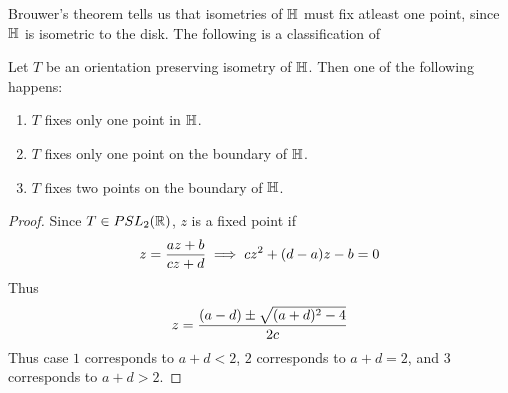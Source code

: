 Brouwer's theorem tells us that isometries of $\mathbb{H}$ must fix atleast one point, since $\mathbb{H}$ is isometric to the disk. The following is a classification of
\begin{theorem}
  Let $T$ be an orientation preserving isometry of $\mathbb{H}$. Then one of the following happens:
  \begin{enumerate}
    \item $T$ fixes only one point in $\mathbb{H}$.
    \item $T$ fixes only one point on the boundary of $\mathbb{H}$.
    \item $T$ fixes two points on the boundary of $\mathbb{H}$.
  \end{enumerate}
\end{theorem}
\begin{proof}
  Since $T\in PSL_2(\mathbb{R})$, $z$ is a fixed point if
  \begin{align*}
    z = \frac{az+b}{cz+d} \implies cz^2 + (d-a)z - b = 0
  \end{align*}
  Thus
  \begin{align*}
    z = \frac{(a-d) \pm \sqrt{(a+d)^2 -4}}{2c}
  \end{align*}
  Thus case $1$ corresponds to $a+d<2$, $2$ corresponds to $a+d = 2$, and $3$ corresponds to $a+d>2$. 
\end{proof}
